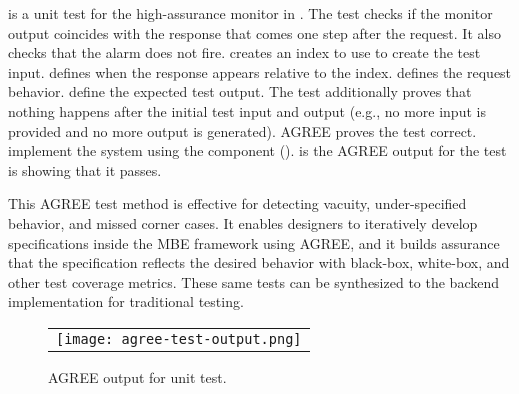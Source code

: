  is a unit test for the high-assurance monitor in .
The test checks if the monitor output coincides with the response that comes one step after the request.
It also checks that the alarm does not fire.
 creates an index to use to create the test input.
 defines when the response appears relative to the index.
 defines the request behavior.
 define the expected test output.
The test additionally proves that nothing happens after the initial test input and output (e.g., no more input is provided and no more output is generated).
AGREE proves the test correct.
 implement the system using the component ().
 is the AGREE output for the test is showing that it passes. 

This AGREE test method is effective for detecting vacuity, under-specified behavior, and missed corner cases.
It enables designers to iteratively develop specifications inside the MBE framework using AGREE, and it builds assurance that the specification reflects the desired behavior with black-box, white-box, and other test coverage metrics.
These same tests can be synthesized to the backend implementation for traditional testing.

\begin{figure}
  \begin{center}
    \begin{tabular}{c}
      \texttt{[image: agree-test-output.png]} \\
    \end{tabular}
  \end{center}
  \caption{AGREE output for unit test.} 
  \label{fig:test-output}
\end{figure}